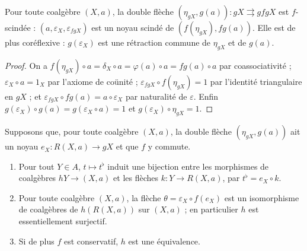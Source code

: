 \begin{lemme}\label{lem:19-paire}
Pour toute coalgèbre $(X, a)$, la double flèche $(\eta_{gX}, g(a)) : gX \rightrightarrows gfgX$ est $f$-scindée : $(a, \varepsilon_X, \varepsilon_{fgX})$ est un noyau scindé de $(f(\eta_{gX}), fg(a))$. Elle est de plus coréflexive : $g(\varepsilon_X)$ est une rétraction commune de $\eta_{gX}$ et de $g(a)$.
\end{lemme}

\begin{proof}
On a $f(\eta_{gX}) \circ a = \delta_X \circ a = \varphi(a) \circ a = fg(a) \circ a$ par coassociativité ; $\varepsilon_X \circ a = 1_X$ par l'axiome de coünité ; $\varepsilon_{fgX} \circ f(\eta_{gX}) = 1$ par l'identité triangulaire en $gX$ ; et $\varepsilon_{fgX} \circ fg(a) = a \circ \varepsilon_X$ par naturalité de $\varepsilon$. Enfin $g(\varepsilon_X) \circ g(a) = g(\varepsilon_X \circ a) = 1$ et $g(\varepsilon_X) \circ \eta_{gX} = 1$.
\end{proof}

\begin{lemme}\label{lem:19-comp}
Supposons que, pour toute coalgèbre $(X, a)$, la double flèche $(\eta_{gX}, g(a))$ ait un noyau $e_X : R(X, a) \to gX$ et que $f$ y commute.
\begin{enumerate}
\item Pour tout $Y \in A$, $t \mapsto t^\flat$ induit une bijection entre les morphismes de coalgèbres $hY \to (X, a)$ et les flèches $k : Y \to R(X, a)$, par $t^\flat = e_X \circ k$.
\item Pour toute coalgèbre $(X, a)$, la flèche $\theta = \varepsilon_X \circ f(e_X)$ est un isomorphisme de coalgèbres de $h(R(X, a))$ sur $(X, a)$ ; en particulier $h$ est essentiellement surjectif.
\item Si de plus $f$ est conservatif, $h$ est une équivalence.
\end{enumerate}
\end{lemme}

